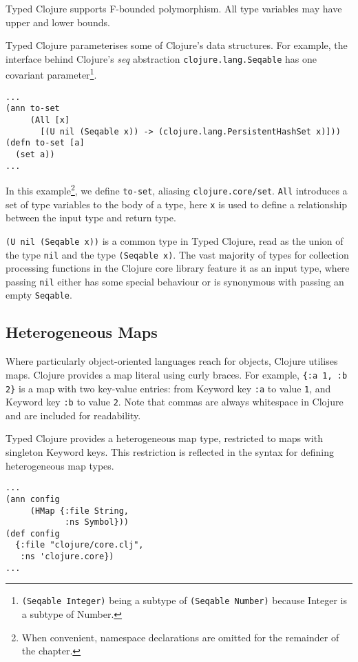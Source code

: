 Typed Clojure supports F-bounded polymorphism. All type variables may have
upper and lower bounds.

Typed Clojure parameterises some of Clojure's data structures. For example,
the interface behind Clojure's \emph{seq} abstraction \lstinline|clojure.lang.Seqable| has one 
covariant parameter\footnote{\lstinline|(Seqable Integer)| being a subtype of \lstinline|(Seqable Number)|
because Integer is a subtype of Number.}.

\begin{lstlisting}
...
(ann to-set 
     (All [x]
       [(U nil (Seqable x)) -> (clojure.lang.PersistentHashSet x)]))
(defn to-set [a]
  (set a))
...
\end{lstlisting}

In this example\footnote{When convenient, namespace declarations are omitted for the remainder of the chapter.}, 
we define \lstinline|to-set|, aliasing \lstinline|clojure.core/set|.
\lstinline|All| introduces a set of type variables to the body of a type,
here \lstinline|x| is used to define a relationship between the input type and return type.

\lstinline|(U nil (Seqable x))| is a common type in Typed Clojure, read as the union
of the type \lstinline|nil| and the type \lstinline|(Seqable x)|.
The vast majority of types for collection processing functions in the Clojure core library feature
it as an input type, where passing \lstinline|nil| either has some special behaviour 
or is synonymous with passing an empty \lstinline|Seqable|.

\subsection{Heterogeneous Maps}

Where particularly object-oriented languages reach for objects, Clojure
utilises maps. Clojure provides a map literal using curly braces. For example,
\lstinline|{:a 1, :b 2}| is a map with two key-value entries: from Keyword key \lstinline|:a|
to value \lstinline|1|, and Keyword key \lstinline|:b| to value \lstinline|2|. Note that commas are always
whitespace in Clojure and are included for readability.

Typed Clojure provides a heterogeneous map type, restricted to 
maps with singleton Keyword keys. This restriction is reflected
in the syntax for defining heterogeneous map types.

\begin{lstlisting}
...
(ann config
     (HMap {:file String,
            :ns Symbol}))
(def config
  {:file "clojure/core.clj",
   :ns 'clojure.core})
...
\end{lstlisting}

